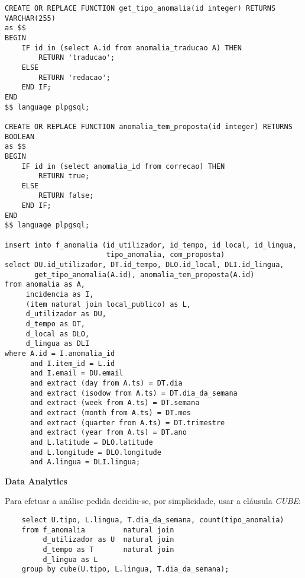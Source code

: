 \documentclass[12pt]{report}
\begin{document}
\begin{verbatim}
CREATE OR REPLACE FUNCTION get_tipo_anomalia(id integer) RETURNS VARCHAR(255)
as $$
BEGIN
    IF id in (select A.id from anomalia_traducao A) THEN
        RETURN 'traducao';
    ELSE
        RETURN 'redacao';
    END IF;
END
$$ language plpgsql;

CREATE OR REPLACE FUNCTION anomalia_tem_proposta(id integer) RETURNS BOOLEAN
as $$
BEGIN
    IF id in (select anomalia_id from correcao) THEN
        RETURN true;
    ELSE
        RETURN false;
    END IF;
END
$$ language plpgsql;

insert into f_anomalia (id_utilizador, id_tempo, id_local, id_lingua,
                        tipo_anomalia, com_proposta)
select DU.id_utilizador, DT.id_tempo, DLO.id_local, DLI.id_lingua,
       get_tipo_anomalia(A.id), anomalia_tem_proposta(A.id)
from anomalia as A,
     incidencia as I,
     (item natural join local_publico) as L,
     d_utilizador as DU,
     d_tempo as DT,
     d_local as DLO,
     d_lingua as DLI
where A.id = I.anomalia_id
      and I.item_id = L.id
      and I.email = DU.email
      and extract (day from A.ts) = DT.dia
      and extract (isodow from A.ts) = DT.dia_da_semana
      and extract (week from A.ts) = DT.semana
      and extract (month from A.ts) = DT.mes
      and extract (quarter from A.ts) = DT.trimestre
      and extract (year from A.ts) = DT.ano
      and L.latitude = DLO.latitude
      and L.longitude = DLO.longitude
      and A.lingua = DLI.lingua;
    \end{verbatim}


    \Large
    \textbf{Data Analytics}\\
    \normalsize
    \par Para efetuar a análise pedida decidiu-se, por simplicidade, usar a cláusula \textit{CUBE}:
    \footnotesize \begin{verbatim}
    select U.tipo, L.lingua, T.dia_da_semana, count(tipo_anomalia)
    from f_anomalia         natural join
         d_utilizador as U  natural join
         d_tempo as T       natural join
         d_lingua as L
    group by cube(U.tipo, L.lingua, T.dia_da_semana);
    \end{verbatim}\normalsize
\end{document}
